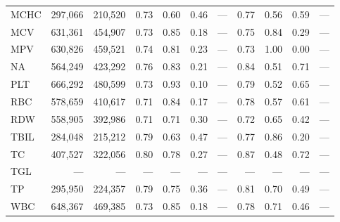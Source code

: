 \begin{table}[ht]
\begin{tabular}{lrrrrrrrrrr}
MCHC & 297,066 & 210,520 & 0.73 & 0.60 & 0.46 & --- & 0.77 & 0.56 & 0.59 & --- \\
MCV & 631,361 & 454,907 & 0.73 & 0.85 & 0.18 & --- & 0.75 & 0.84 & 0.29 & --- \\
MPV & 630,826 & 459,521 & 0.74 & 0.81 & 0.23 & --- & 0.73 & 1.00 & 0.00 & --- \\
NA & 564,249 & 423,292 & 0.76 & 0.83 & 0.21 & --- & 0.84 & 0.51 & 0.71 & --- \\
PLT & 666,292 & 480,599 & 0.73 & 0.93 & 0.10 & --- & 0.79 & 0.52 & 0.65 & --- \\
RBC & 578,659 & 410,617 & 0.71 & 0.84 & 0.17 & --- & 0.78 & 0.57 & 0.61 & --- \\
RDW & 558,905 & 392,986 & 0.71 & 0.71 & 0.30 & --- & 0.72 & 0.65 & 0.42 & --- \\
TBIL & 284,048 & 215,212 & 0.79 & 0.63 & 0.47 & --- & 0.77 & 0.86 & 0.20 & --- \\
TC & 407,527 & 322,056 & 0.80 & 0.78 & 0.27 & --- & 0.87 & 0.48 & 0.72 & --- \\
TGL & --- & --- & --- & --- & --- & --- & --- & --- & --- & --- \\
TP & 295,950 & 224,357 & 0.79 & 0.75 & 0.36 & --- & 0.81 & 0.70 & 0.49 & --- \\
WBC & 648,367 & 469,385 & 0.73 & 0.85 & 0.18 & --- & 0.78 & 0.71 & 0.46 & --- \\
\bottomrule
\end{tabular}
\label{tab:12_eval_detail_chs_t2d}
\end{table}